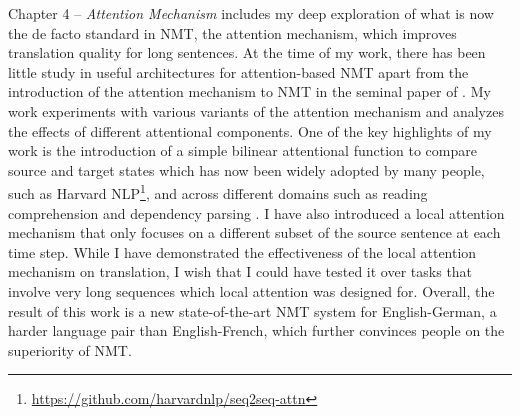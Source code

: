 Chapter 4 -- {\it Attention Mechanism} includes my deep exploration of what is now the de facto standard in NMT, the attention mechanism, which improves translation quality for long sentences. At the time of my work, there has been little study in useful architectures for attention-based NMT apart from the introduction of the attention mechanism to NMT in the seminal paper of . My work experiments with various variants of the attention mechanism and analyzes the effects of different attentional components. One of the key highlights of my work is the introduction of a simple bilinear attentional function to compare source and target states which has now been widely adopted by many people, such as Harvard NLP\footnote{\url{https://github.com/harvardnlp/seq2seq-attn}}, and across different domains such as reading comprehension \cite{chen16} and dependency parsing \cite{dozat16}. I have also introduced a local attention mechanism that only focuses on a different subset of the source sentence at each time step. While I have demonstrated the effectiveness of the local attention mechanism on translation, I wish that I could have tested it over tasks that involve very long sequences which local attention was designed for. Overall, the result of this work is a new state-of-the-art NMT system for English-German, a harder language pair than English-French, which further convinces people on the superiority of NMT.

